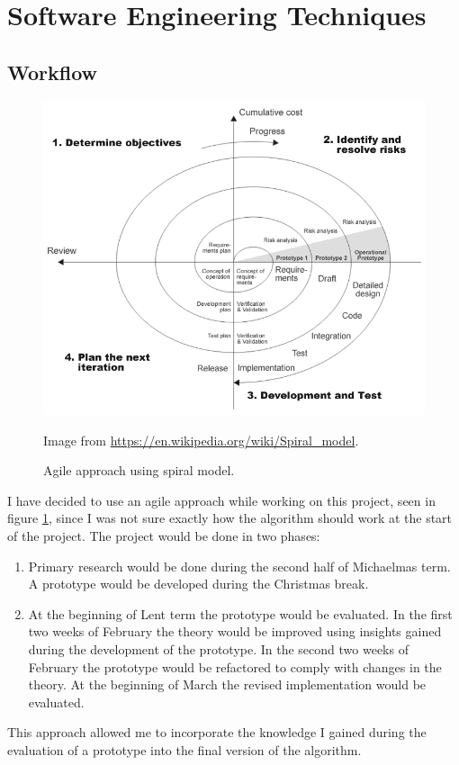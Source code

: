\documentclass[12pt,a4paper]{book}
\newcommand\note[1]{\vspace*{-0.5\baselineskip}\caption*{#1}}
\begin{document}
\section{Software Engineering Techniques}
\subsection{Workflow}
\begin{figure}[ht]
\centering
\includegraphics[scale=0.5]{spiral-model}
\caption{Agile approach using spiral model.}
\note{Image from \url{https://en.wikipedia.org/wiki/Spiral_model}.}
\label{fig:spiral-model}
\end{figure}
I have decided to use an agile approach while working on this project, seen in figure \ref{fig:spiral-model}, since I was not sure exactly how the algorithm should work at the start of the project.
The project would be done in two phases:
\begin{enumerate}
\item Primary research would be done during the second half of Michaelmas term.
A prototype would be developed during the Christmas break.
\item At the beginning of Lent term the prototype would be evaluated.
In the first two weeks of February the theory would be improved using insights gained during the development of the prototype.
In the second two weeks of February the prototype would be refactored to comply with changes in the theory.
At the beginning of March the revised implementation would be evaluated.
\end{enumerate}
This approach allowed me to incorporate the knowledge I gained during the evaluation of a prototype into the final version of the algorithm.
\end{document}
